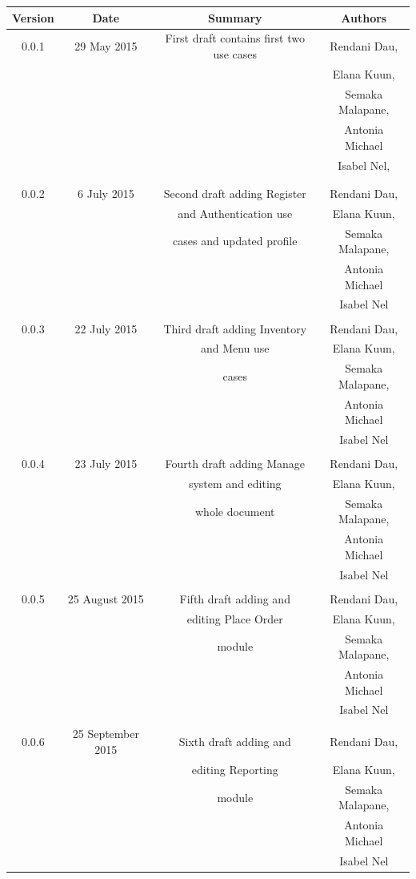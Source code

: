 \documentclass[a4paper,12pt]{report}
\begin{document}
\begin{table}[h!]
\centering
 \begin{tabular}{||c c c c||} 
 \hline
 \textbf{Version} & \textbf{Date} & \textbf{Summary} & \textbf{Authors} \\ [0.5ex] 
 \hline\hline
 0.0.1 & 29 May 2015 &  First draft contains first two use cases  & Rendani Dau, \\ & & & Elana Kuun, \\ & & & Semaka Malapane, \\ & & & Antonia Michael \\ & & & Isabel Nel, \\ & & & \\
 \hline 
 & & & \\
 0.0.2 & 6 July 2015 &  Second draft adding Register & Rendani Dau, \\ & & and Authentication use & Elana Kuun, \\ & & cases and updated profile & Semaka Malapane, \\ & & &  Antonia Michael \\ & & & Isabel Nel \\   [1ex] 
 \hline
& & & \\
 0.0.3 & 22 July 2015 &  Third draft adding Inventory & Rendani Dau, \\ & & and Menu use & Elana Kuun, \\ & & cases  & Semaka Malapane, \\ & & &  Antonia Michael \\ & & & Isabel Nel \\   [1ex] 
 \hline
& & & \\
 0.0.4 & 23 July 2015 &  Fourth draft adding Manage & Rendani Dau, \\ & & system and editing & Elana Kuun, \\ & & whole document  & Semaka Malapane, \\ & & &  Antonia Michael \\ & & & Isabel Nel \\   [1ex] 
 \hline
& & & \\
 0.0.5 & 25 August 2015 &  Fifth draft adding and & Rendani Dau, \\ & & editing Place Order  & Elana Kuun, \\ & & module  & Semaka Malapane, \\ & & &  Antonia Michael \\ & & & Isabel Nel \\   [1ex] 
\hline
& & & \\
 0.0.6 & 25 September 2015 &  Sixth draft adding and & Rendani Dau, \\ & & editing Reporting  & Elana Kuun, \\ & & module  & Semaka Malapane, \\ & & &  Antonia Michael \\ & & & Isabel Nel \\   [1ex] 
\hline
 \end{tabular}
\end{table}
\end{document}
